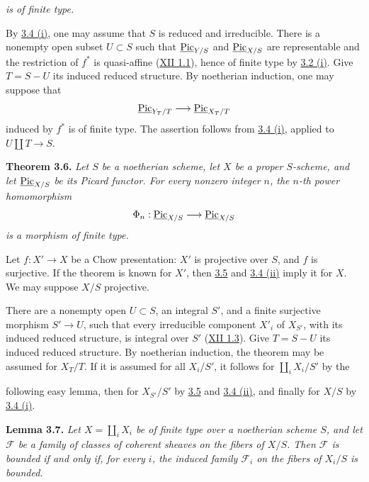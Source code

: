 \emph{is of finite type.}

By \hyperlink{sga6.e13.lem.3-4}{3.4 (i)}, one may assume that \(S\) is reduced and irreducible. There
is a nonempty open subset \(U\subset S\) such that
\(\underline{\operatorname{Pic}}_{Y/S}\) and \(\underline{\operatorname{Pic}}_{X/S}\) are
representable and the restriction of \(f^*\) is quasi-affine (\hyperlink{sga6.e12.thm.1-1}{XII 1.1}),
hence of finite type by \hyperlink{sga6.e13.prop.3-2}{3.2 (i)}. Give \(T=S-U\) its induced reduced
structure. By noetherian induction, one may suppose that
\[
\underline{\operatorname{Pic}}_{Y_T/T}\longrightarrow\underline{\operatorname{Pic}}_{X_T/T}
\]
induced by \(f^*\) is of finite type. The assertion follows from \hyperlink{sga6.e13.lem.3-4}{3.4 (i)},
applied to \(U\amalg T\to S\).

\textbf{Theorem 3.6.} \emph{Let \(S\) be a noetherian scheme, let \(X\)
be a proper \(S\)-scheme, and let \(\underline{\operatorname{Pic}}_{X/S}\) be its
Picard functor. For every nonzero integer \(n\), the \(n\)-th power
homomorphism}
\[
\Phi_n:\underline{\operatorname{Pic}}_{X/S}\longrightarrow\underline{\operatorname{Pic}}_{X/S}
\]
\emph{is a morphism of finite type.}

Let \(f:X'\to X\) be a Chow presentation: \(X'\) is projective over \(S\),
and \(f\) is surjective. If the theorem is known for \(X'\), then \hyperlink{sga6.e13.thm.3-5}{3.5} and
\hyperlink{sga6.e13.lem.3-4}{3.4 (ii)} imply it for \(X\). We may suppose \(X/S\) projective.

There are a nonempty open \(U\subset S\), an integral \(S'\), and a
finite surjective morphism \(S'\to U\), such that every irreducible
component \(X'_i\) of \(X_{S'}\), with its induced reduced structure, is
integral over \(S'\) (\hyperlink{sga6.e12.lem.1-3}{XII 1.3}). Give \(T=S-U\) its induced reduced
structure. By noetherian induction, the theorem may be assumed for
\(X_T/T\). If it is assumed for all \(X_i/S'\), it follows for
\(\coprod_iX_i/S'\) by the

following easy lemma, then for \(X_{S'}/S'\) by \hyperlink{sga6.e13.thm.3-5}{3.5} and \hyperlink{sga6.e13.lem.3-4}{3.4 (ii)}, and
finally for \(X/S\) by \hyperlink{sga6.e13.lem.3-4}{3.4 (i)}.

\textbf{Lemma 3.7.} \emph{Let \(X=\coprod_iX_i\) be of finite type over a
noetherian scheme \(S\), and let \(\mathcal F\) be a family of classes of
coherent sheaves on the fibers of \(X/S\). Then \(\mathcal F\) is bounded
if and only if, for every \(i\), the induced family \(\mathcal F_i\) on
the fibers of \(X_i/S\) is bounded.}

